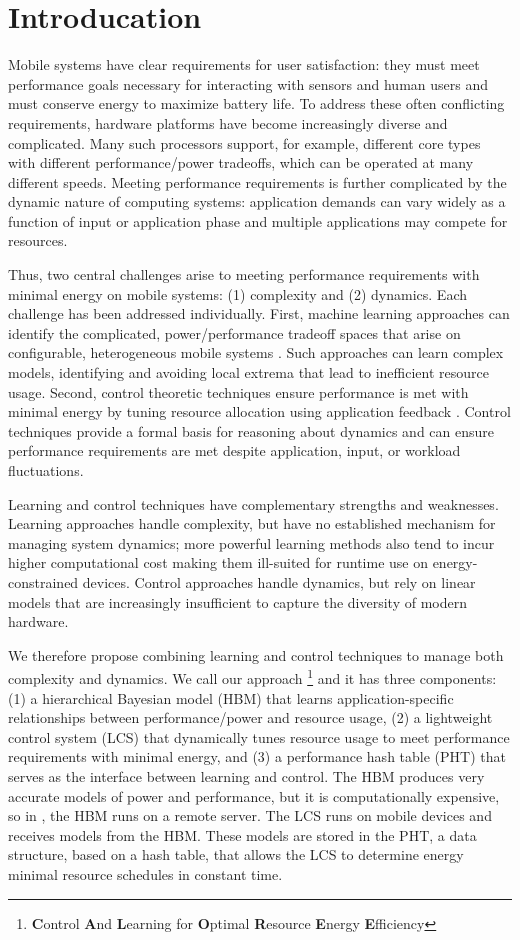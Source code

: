 \section{Introducation}
Mobile systems have clear requirements for user satisfaction: they
must meet performance goals necessary for interacting with sensors and
human users and must conserve energy to maximize battery life.  To
address these often conflicting requirements, hardware platforms have
become increasingly diverse and complicated.  Many such processors
support, for example, different core types with different
performance/power tradeoffs, which can be operated at many different
speeds.  Meeting performance requirements is further complicated by
the dynamic nature of computing systems: application demands can vary
widely as a function of input or application phase and multiple
applications may compete for resources.

Thus, two central challenges arise to meeting performance requirements
with minimal energy on mobile systems: (1) complexity and (2)
dynamics.  Each challenge has been addressed individually.  First,
machine learning approaches can identify the complicated,
power/performance tradeoff spaces that arise on configurable,
heterogeneous mobile systems \cite{}.  Such approaches can learn
complex models, identifying and avoiding local extrema that lead to
inefficient resource usage.  Second, control theoretic techniques
ensure performance is met with minimal energy by tuning resource
allocation using application feedback \cite{}.  Control techniques
provide a formal basis for reasoning about dynamics and can ensure
performance requirements are met despite application, input, or
workload fluctuations.

Learning and control techniques have complementary strengths and
weaknesses.  Learning approaches handle complexity, but have no
established mechanism for managing system dynamics; more powerful
learning methods also tend to incur higher computational cost making
them ill-suited for runtime use on energy-constrained devices.
Control approaches handle dynamics, but rely on linear models that are
increasingly insufficient to capture the diversity of modern hardware.

We therefore propose combining learning and control techniques to
manage both complexity and dynamics.  We call our approach
\SYSTEM{}\footnote{\textbf{C}ontrol \textbf{A}nd \textbf{L}earning for
  \textbf{O}ptimal \textbf{R}esource \textbf{E}nergy
  \textbf{E}fficiency} and it has three components: (1) a hierarchical
Bayesian model (HBM) that learns application-specific relationships
between performance/power and resource usage, (2) a lightweight
control system (LCS) that dynamically tunes resource usage to meet
performance requirements with minimal energy, and (3) a performance
hash table (PHT) that serves as the interface between learning and
control.  The HBM produces very accurate models of power and
performance, but it is computationally expensive, so in \SYSTEM{}, the
HBM runs on a remote server.  The LCS runs on mobile devices and
receives models from the HBM.  These models are stored in the PHT, a
data structure, based on a hash table, that allows the LCS to
determine energy minimal resource schedules in constant time.  

